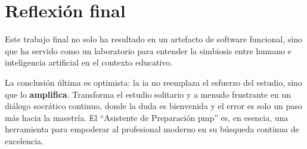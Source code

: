 \section{Reflexión final}

Este trabajo final no solo ha resultado en un artefacto de software funcional, sino que ha servido como un laboratorio para entender la simbiosis entre humano e inteligencia artificial en el contexto educativo.

La conclusión última es optimista: la \gls{ia} no reemplaza el esfuerzo del estudio, sino que lo \textbf{amplifica}. Transforma el estudio solitario y a menudo frustrante en un diálogo socrático continuo, donde la duda es bienvenida y el error es solo un paso más hacia la maestría. El \enquote{Asistente de Preparación \gls{pmp}} es, en esencia, una herramienta para empoderar al profesional moderno en su búsqueda continua de excelencia.
